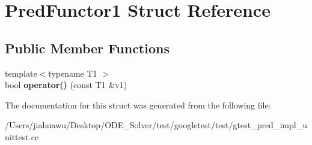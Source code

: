 \hypertarget{struct_pred_functor1}{}\section{Pred\+Functor1 Struct Reference}
\label{struct_pred_functor1}
\subsection*{Public Member Functions}
\begin{DoxyCompactItemize}
\item 
\mbox{\label{struct_pred_functor1_a78d81d1bac0ee7f81ea631c49bfab3e2}} 
{\footnotesize template$<$typename T1 $>$ }\\bool {\bfseries operator()} (const T1 \&v1)
\end{DoxyCompactItemize}


The documentation for this struct was generated from the following file\+:\begin{DoxyCompactItemize}
\item 
/\+Users/jiahuawu/\+Desktop/\+O\+D\+E\+\_\+\+Solver/test/googletest/test/gtest\+\_\+pred\+\_\+impl\+\_\+unittest.\+cc\end{DoxyCompactItemize}
